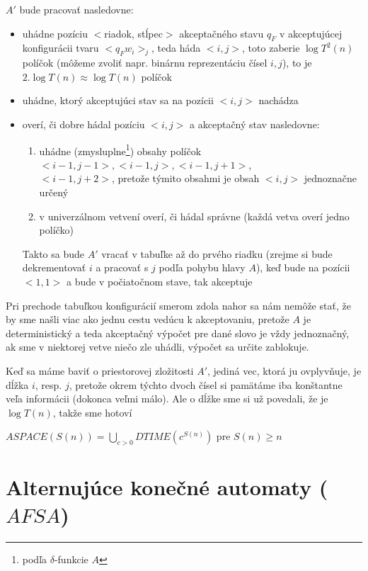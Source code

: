 \begin{dokaz}
$A'$ bude pracovať nasledovne:
\begin{itemize}
\item uhádne pozíciu $<$riadok, stĺpec$>$ akceptačného stavu $q_F$
v akceptujúcej kon\-fi\-gu\-rá\-cii tvaru \mbox{$<q_Fw_i>_j$},
teda háda $<i,j>$, toto zaberie $\log T^2(n)$ políčok (môžeme
zvoliť napr. binárnu reprezentáciu čísel $i,j$), to je $2.\log
T(n)\approx\log T(n)$ políčok
\item uhádne, ktorý akceptujúci stav sa na pozícii $<i,j>$
nachádza
\item overí, či dobre hádal pozíciu $<i,j>$ a akceptačný stav
nasledovne:
\begin{enumerate}
\item uhádne (zmysluplne\footnote{podľa $\delta$-funkcie $A$})
obsahy políčok
\mbox{$<i-1,j-1>,<i-1,j>,<i-1,j+1>$},\\\mbox{$<i-1,j+2>$}, pretože
týmito obsahmi je obsah $<i,j>$ jednoznačne určený
\item v univerzálnom vetvení overí, či hádal správne (každá
vetva overí jedno políčko)
\end{enumerate}
Takto sa bude $A'$ vracať v tabuľke až do prvého riadku (zrejme si
bude dekrementovať $i$ a pracovať s $j$ podľa pohybu hlavy $A$),
keď bude na pozícii $<1,1>$ a bude v počiatočnom stave, tak
akceptuje
\end{itemize}
Pri prechode tabuľkou konfigurácií smerom zdola nahor sa nám
nemôže stať, že by sme našli viac ako jednu cestu vedúcu k
akceptovaniu, pretože $A$ je deterministický a teda akceptačný
výpočet pre dané slovo je vždy jednoznačný, ak sme v niektorej
vetve niečo zle uhádli, výpočet sa určite zablokuje.

\smallskip
Keď sa máme baviť o priestorovej zložitosti $A'$, jediná vec,
ktorá ju ovplyvňuje, je dĺžka $i$, resp. $j$, pretože okrem týchto
dvoch čísel si pamätáme iba konštantne veľa informácii (dokonca
veľmi málo). Ale o dĺžke sme si už povedali, že je $\log T(n)$,
takže sme hotoví
\end{dokaz}

\begin{dosledok}
$ASPACE(S(n))=\underset{{c>0}}{\bigcup}DTIME(c^{S(n)})$ pre
$S(n)\geq n$
\end{dosledok}

\section{Alternujúce konečné automaty ($AFSA$)}

